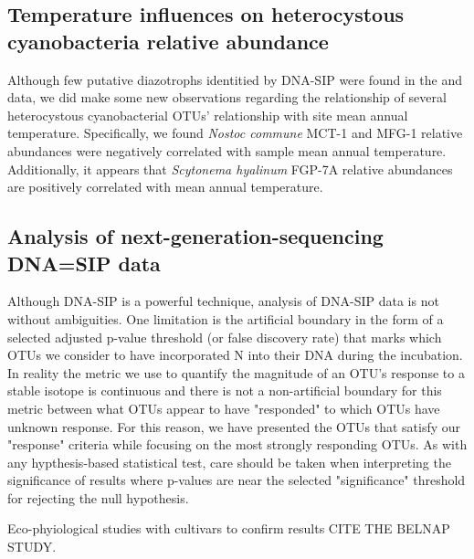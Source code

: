 \subsection{Temperature influences on heterocystous cyanobacteria relative abundance}
Although few putative diazotrophs identitied by DNA-SIP were found in the \citet{Garcia_Pichel_2013} and \citet{Steven_2013} data, we did make some new observations regarding the relationship of several heterocystous cyanobacterial OTUs' relationship with site mean annual temperature. Specifically, we found \textit{Nostoc commune} MCT-1 and MFG-1 relative abundances were negatively correlated with sample mean annual temperature. Additionally, it appears that \textit{Scytonema hyalinum} FGP-7A relative abundances are positively correlated with mean annual temperature.

\subsection{Analysis of next-generation-sequencing DNA=SIP data}
Although DNA-SIP is a powerful technique, analysis of DNA-SIP data is not without ambiguities. One limitation is the artificial boundary in the form of a selected adjusted p-value threshold (or false discovery rate) that marks which OTUs we consider to have incorporated N into their DNA during the incubation. In reality the metric we use to quantify the magnitude of an OTU's response to a stable isotope is continuous and there is not a non-artificial boundary for this metric between what OTUs appear to have "responded" to which OTUs have unknown response. For this reason, we have presented the OTUs that satisfy our "response" criteria while focusing on the most strongly responding OTUs. As with any hypthesis-based statistical test, care should be taken when interpreting the significance of results where p-values are near the selected "significance" threshold for rejecting the null hypothesis.

Eco-phyiological studies with cultivars to confirm results CITE THE BELNAP STUDY.

